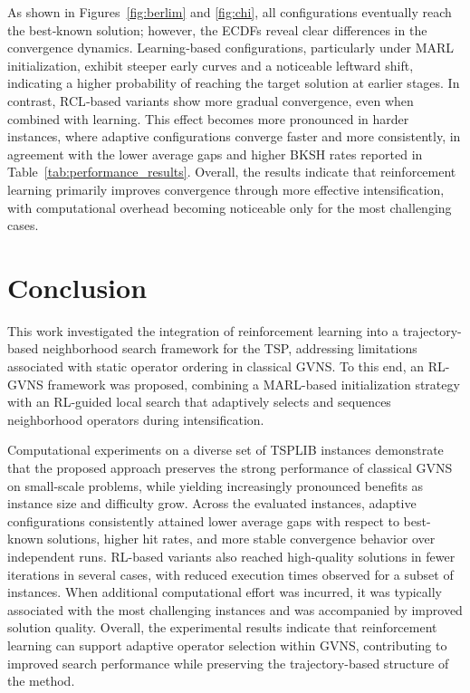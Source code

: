 \documentclass[runningheads]{llncs}
\begin{document}
\noindent 
As shown in Figures~\ref{fig:berlim} and \ref{fig:chi}, all configurations eventually reach the best‑known solution; however, the ECDFs reveal clear differences in the convergence dynamics. Learning‑based configurations, particularly under MARL initialization, exhibit steeper early curves and a noticeable leftward shift, indicating a higher probability of reaching the target solution at earlier stages. In contrast, RCL‑based variants show more gradual convergence, even when combined with learning.
This effect becomes more pronounced in harder instances, where adaptive configurations converge faster and more consistently, in agreement with the lower average gaps and higher BKSH rates reported in Table~\ref{tab:performance_results}. Overall, the results indicate that reinforcement learning primarily improves convergence through more effective intensification, with computational overhead becoming noticeable only for the most challenging cases.

\section{Conclusion}
\label{sec:5}
This work investigated the integration of reinforcement learning into a trajectory-based neighborhood search framework for the TSP, addressing limitations associated with static operator ordering in classical GVNS. To this end, an RL-GVNS framework was proposed, combining a MARL-based initialization strategy with an RL-guided local search that adaptively selects and sequences neighborhood operators during intensification.

Computational experiments on a diverse set of TSPLIB instances demonstrate that the proposed approach preserves the strong performance of classical GVNS on small-scale problems, while yielding increasingly pronounced benefits as instance size and difficulty grow. Across the evaluated instances, adaptive configurations consistently attained lower average gaps with respect to best-known solutions, higher hit rates, and more stable convergence behavior over independent runs. RL-based variants also reached high-quality solutions in fewer iterations in several cases, with reduced execution times observed for a subset of instances. When additional computational effort was incurred, it was typically associated with the most challenging instances and was accompanied by improved solution quality. Overall, the experimental results indicate that reinforcement learning can support adaptive operator selection within GVNS, contributing to improved search performance while preserving the trajectory-based structure of the method.
\end{document}
